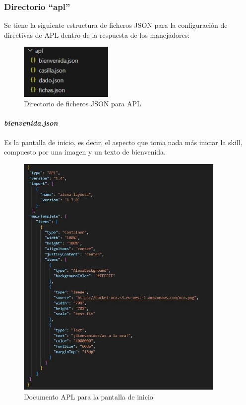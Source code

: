 \subsubsection{Directorio \enquote{apl}}

Se tiene la siguiente estructura de ficheros JSON para la configuración de directivas de APL dentro de la respuesta de los manejadores:
\begin{figure}[H]
	\centering
	\includegraphics[width=0.4\textwidth]{imgs/apl-carpeta.jpg}
	\caption{Directorio de ficheros JSON para APL}
	\label{fig:apl-carpeta}
\end{figure}

\paragraph{\textit{bienvenida.json}}

Es la pantalla de inicio, es decir, el aspecto que toma nada más iniciar la skill, compuesto por una imagen y un texto de bienvenida.

\begin{figure}[H]
	\centering
	\includegraphics[width=0.9\textwidth]{imgs/apl-bienvenida.jpg}
	\caption{Documento APL para la pantalla de inicio}
	\label{fig:apl-bienvenida}
\end{figure}


